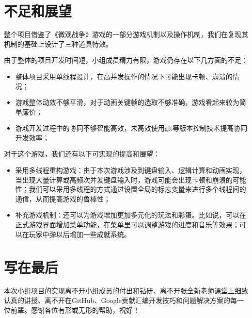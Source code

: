 \section{不足和展望}
整个项目借鉴了《微观战争》游戏的一部分游戏机制以及操作机制，我们在复现其机制的基础上设计了三种道具特效。
\par
由于整体的项目开发时间短，小组成员精力有限，游戏仍存在以下几方面的不足：
\begin{itemize}
    \item 整体项目采用单线程设计，在高并发操作的情况下可能出现卡顿、崩溃的情况；
    \item 游戏整体动效不够平滑，对于动画关键帧的选取不够准确，游戏看起来较为简单廉价；
    \item 游戏开发过程中的协同不够智能高效，未高效使用git等版本控制技术提高协同开发效率；
\end{itemize}
对于这个游戏，我们还有以下可实现的提高和展望：
\begin{itemize}
    \item 采用多线程重构游戏：由于本次游戏涉及到键盘输入、逻辑计算和动画实现，当出现大量计算或高频次并发键盘输入时，游戏可能会出现卡顿和崩溃的可能性；我们可以采用多线程的方式通过设置全局的标志变量来进行多个线程间的通信，从而提高游戏的鲁棒性；
    \item 补充游戏机制：还可以为游戏增加更加多元化的玩法和彩蛋。比如说，可以在正式游戏界面增加菜单功能，在菜单里可以调整游戏的进度和音乐等效果；可以在玩家中弹以后增加一些成就系统。
\end{itemize}
\section{写在最后}
本次小组项目的实现离不开小组成员的付出和钻研、离不开张全新老师课堂上细致认真的讲授、离不开在GitHub、Google贡献汇编开发技巧和问题解决方案的每一位前辈。感谢各位有形或无形的帮助，祝好！